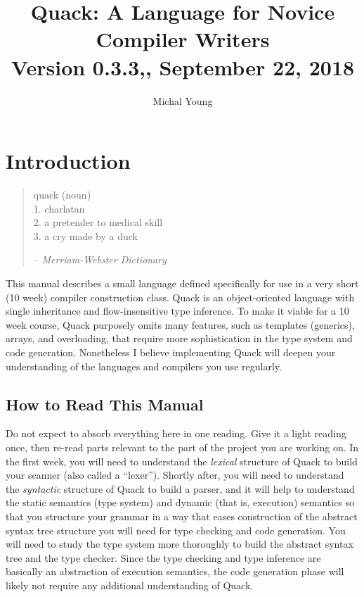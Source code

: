 \documentclass[11pt]{article}
\begin{document}
\title{Quack:  A Language for Novice Compiler Writers\\
\small   Version 0.3.3,, September 22, 2018}

\author{Michal Young}
\date{ }
\maketitle

\tableofcontents 
\clearpage

\section{Introduction}

\begin{quotation}
\noindent
quack (noun)\\
1. charlatan\\
2. a pretender to medical skill\\
3. a cry made by a duck
\begin{flushright}
-- \em Merriam-Webster Dictionary
\end{flushright}
\end{quotation}

This manual describes a small language defined
specifically for use  
in a very short (10 week) compiler construction class.  Quack is an
object-oriented language with single inheritance and flow-insensitive
type inference.  To make it
viable for a 10 week course, Quack
purposely omits many features, such as templates (generics),  
arrays, and overloading,  that require more sophistication in the type system and code
generation.   Nonetheless I believe implementing Quack will deepen your
understanding of the languages and compilers you use regularly. 


\subsection{How to Read This Manual}

Do not expect to absorb everything here in one reading.   Give it a
light reading once, then re-read parts relevant to the part of the
project you are working on.  In the first week, you will need to
understand the \emph{lexical}
structure of Quack to build your scanner (also called a ``lexer'').
Shortly after, you will need to understand the \emph{syntactic}
structure of Quack to build a parser, and it will help to understand
the static semantics (type system) and dynamic (that is, execution)
semantics so that you structure your grammar in a way that eases
construction of the abstract syntax tree structure you will need for
type checking and code generation.  You will need to study the type
system more thoroughly to build the abstract syntax tree and the type
checker.   Since the type checking and type inference are basically an
abstraction of execution semantics, the code generation phase will
likely not require any additional understanding of Quack. 
\end{document}
